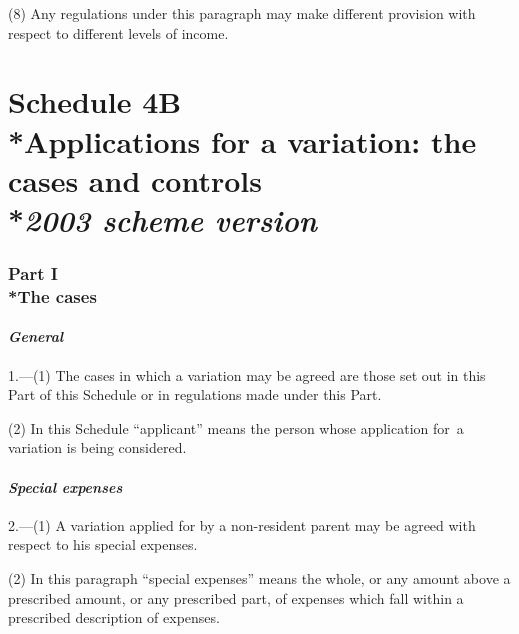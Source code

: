 \documentclass[12pt,a4paper]{article}
\begin{document}
(8) Any regulations under this paragraph may make different provision with respect to different levels of income.

\part[Schedule 4B --- Applications for a variation: the cases and controls --- \emph{2003 scheme version}]{\noindent S\lowercase{CHEDULE} 4B\\*Applications for a variation: the cases and controls\\*\emph{2003 scheme version}}


\section[Part I --- The cases]{Part I\\*The cases}

\subsection*{\itshape General}

1.---(1) The cases in which a variation may be agreed are those set out in this Part of this Schedule or in regulations made under this Part.

(2) In this Schedule “applicant” means the person whose application for~a variation is being considered.

\subsection*{\itshape Special expenses}

2.---(1) A variation applied for by a non-resident parent may be agreed with respect to his special expenses.

(2) In this paragraph “special expenses” means the whole, or any amount above a prescribed amount, or any prescribed part, of expenses which fall within a prescribed description of expenses.
\end{document}
